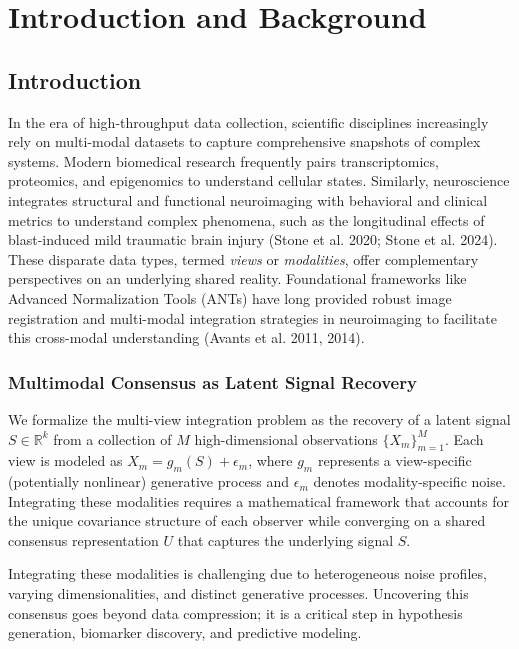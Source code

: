 \documentclass[
  letterpaper,
]{report}
\begin{document}

\chapter{Introduction and Background}\label{introduction-and-background}

\section{Introduction}\label{introduction}

In the era of high-throughput data collection, scientific disciplines
increasingly rely on multi-modal datasets to capture comprehensive
snapshots of complex systems. Modern biomedical research frequently
pairs transcriptomics, proteomics, and epigenomics to understand
cellular states. Similarly, neuroscience integrates structural and
functional neuroimaging with behavioral and clinical metrics to
understand complex phenomena, such as the longitudinal effects of
blast-induced mild traumatic brain injury ({Stone et al.} 2020; {Stone
et al.} 2024). These disparate data types, termed \emph{views} or
\emph{modalities}, offer complementary perspectives on an underlying
shared reality. Foundational frameworks like Advanced Normalization
Tools (ANTs) have long provided robust image registration and
multi-modal integration strategies in neuroimaging to facilitate this
cross-modal understanding (Avants et al. 2011, 2014).

\subsection{Multimodal Consensus as Latent Signal
Recovery}\label{multimodal-consensus-as-latent-signal-recovery}

We formalize the multi-view integration problem as the recovery of a
latent signal \(S \in \mathbb{R}^k\) from a collection of \(M\)
high-dimensional observations \(\{X_m\}_{m=1}^M\). Each view is modeled
as \(X_m = g_m(S) + \epsilon_m\), where \(g_m\) represents a
view-specific (potentially nonlinear) generative process and
\(\epsilon_m\) denotes modality-specific noise. Integrating these
modalities requires a mathematical framework that accounts for the
unique covariance structure of each observer while converging on a
shared consensus representation \(U\) that captures the underlying
signal \(S\).

Integrating these modalities is challenging due to heterogeneous noise
profiles, varying dimensionalities, and distinct generative processes.
Uncovering this consensus goes beyond data compression; it is a critical
step in hypothesis generation, biomarker discovery, and predictive
modeling.
\end{document}
